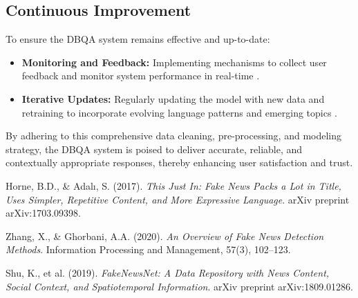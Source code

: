 \documentclass[sigconf]{acmart}
\begin{document}
\subsection{Continuous Improvement}

To ensure the DBQA system remains effective and up-to-date:

\begin{itemize}
    \item \textbf{Monitoring and Feedback:} Implementing mechanisms to collect user feedback and monitor system performance in real-time \cite{turn0search0}.
    \item \textbf{Iterative Updates:} Regularly updating the model with new data and retraining to incorporate evolving language patterns and emerging topics \cite{turn0search0}.
\end{itemize}

By adhering to this comprehensive data cleaning, pre-processing, and modeling strategy, the DBQA system is poised to deliver accurate, reliable, and contextually appropriate responses, thereby enhancing user satisfaction and trust.

\begin{thebibliography}{9}
     Horne, B.D., \& Adalı, S. (2017). \textit{This Just In: Fake News Packs a Lot in Title, Uses Simpler, Repetitive Content, and More Expressive Language}. arXiv preprint arXiv:1703.09398.
    
     Zhang, X., \& Ghorbani, A.A. (2020). \textit{An Overview of Fake News Detection Methods}. Information Processing and Management, 57(3), 102–123.
    
     Shu, K., et al. (2019). \textit{FakeNewsNet: A Data Repository with News Content, Social Context, and Spatiotemporal Information}. arXiv preprint arXiv:1809.01286.
\end{thebibliography}
\end{document}
